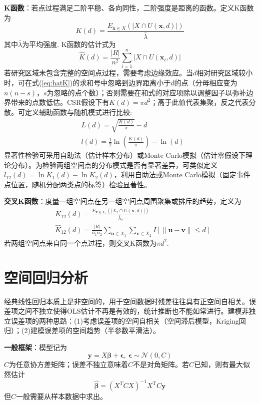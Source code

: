 \par \textbf{K函数}：若点过程满足二阶平稳、各向同性，二阶强度是距离的函数。定义K函数为
\begin{equation}
    K(d)=\frac{E_{\mathbf{x}\in X}(\vert X\cap U(\mathbf{x},d)\vert )}{\bar{\lambda}}
\end{equation}
其中$\bar{\lambda}$为平均强度. K函数的估计式为
\begin{equation}
    \hat{K}(d)=\frac{\vert R \vert}{n^2}\sum_{i=1}^n \vert X\cap U(\mathbf{x}_i,d)\vert
    \label{eq:hatK}
\end{equation}
若研究区域未包含完整的空间点过程，需要考虑边缘效应。当$d$相对研究区域较小时，可在式(\ref{eq:hatK})的求和号中忽略到边界距离小于$d$的点（分母相应变为$n(n-s)$，$s$为忽略的点个数）；否则需要在和式的对应项除以调整因子以弥补边界带来的点数低估。CSR假设下有$K(d)=\pi d^2$；高于此值代表集聚，反之代表分散。可定义辅助函数与随机模式进行比较:
\begin{align}
    &L(d)=\sqrt{\frac{K(d)}{\pi}}-d\\
    &l(d)=\frac{1}{2}\ln\left(\frac{K(d)}{\pi}\right)-\ln(d)
\end{align}
显著性检验可采用自助法（估计样本分布）或Monte Carlo模拟（估计零假设下理论分布）。为检验两组空间点的分布模式是否有显著差异，可类似定义$l_{12}(d)=\ln K_1(d)-\ln K_2(d)$，利用自助法或Monte Carlo模拟（固定事件点位置，随机分配两类点的标签）检验显著性。

\par \textbf{交叉K函数}：度量一组空间点在另一组空间点周围聚集或排斥的趋势，定义为
\begin{align}
    &K_{12}(d)=\frac{E_{\mathbf{x}\in X_1}(\vert X_2\cap U(\mathbf{x},d)\vert )}{\bar{\lambda}_2}\\
    &\hat{K}_{12}(d)=\frac{\vert R \vert}{n_1n_2}\sum_{\mathbf{u}\in X_1}\sum_{\mathbf{v}\in X_2} I[\|\mathbf{u}-\mathbf{v}\|\le d]
\end{align}
若两组空间点来自同一个点过程，则交叉K函数为$\pi d^2$.

\section{空间回归分析}

\par 经典线性回归本质上是非空间的，用于空间数据时残差往往具有正空间自相关。误差项之间不独立使得OLS估计不再是有效的，统计推断也不能如常进行。建模非独立误差项的两种思路：(1)考虑误差项的空间自相关（空间滞后模型，Kriging回归）；(2)建模误差项的空间趋势（半参数平滑法）。
\par \textbf{一般框架}：模型记为
\begin{equation}
\mathbf{y}=X\boldsymbol{\beta}+\boldsymbol{\epsilon},\ \boldsymbol{\epsilon}\sim \mathcal{N}(0,C)
\end{equation}
$C$为任意协方差矩阵；误差不独立意味着$C$不是对角矩阵。若$C$已知，则有最大似然估计
\begin{equation}
    \hat{\boldsymbol{\beta}}=(X^{T}CX)^{-1}X^{\mathrm{T}} C\mathbf{y}
\end{equation}
但$C$一般需要从样本数据中求出。

